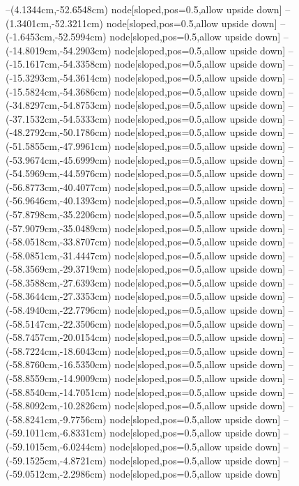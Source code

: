 --(4.1344cm,-52.6548cm) node[sloped,pos=0.5,allow upside down]{\ArrowIn}
--(1.3401cm,-52.3211cm) node[sloped,pos=0.5,allow upside down]{\ArrowIn}
--(-1.6453cm,-52.5994cm) node[sloped,pos=0.5,allow upside down]{\ArrowIn}
--(-14.8019cm,-54.2903cm) node[sloped,pos=0.5,allow upside down]{\ArrowIn}
--(-15.1617cm,-54.3358cm) node[sloped,pos=0.5,allow upside down]{\arrowIn}
--(-15.3293cm,-54.3614cm) node[sloped,pos=0.5,allow upside down]{\arrowIn}
--(-15.5824cm,-54.3686cm) node[sloped,pos=0.5,allow upside down]{\arrowIn}
--(-34.8297cm,-54.8753cm) node[sloped,pos=0.5,allow upside down]{\ArrowIn}
--(-37.1532cm,-54.5333cm) node[sloped,pos=0.5,allow upside down]{\ArrowIn}
--(-48.2792cm,-50.1786cm) node[sloped,pos=0.5,allow upside down]{\ArrowIn}
--(-51.5855cm,-47.9961cm) node[sloped,pos=0.5,allow upside down]{\ArrowIn}
--(-53.9674cm,-45.6999cm) node[sloped,pos=0.5,allow upside down]{\ArrowIn}
--(-54.5969cm,-44.5976cm) node[sloped,pos=0.5,allow upside down]{\ArrowIn}
--(-56.8773cm,-40.4077cm) node[sloped,pos=0.5,allow upside down]{\ArrowIn}
--(-56.9646cm,-40.1393cm) node[sloped,pos=0.5,allow upside down]{\arrowIn}
--(-57.8798cm,-35.2206cm) node[sloped,pos=0.5,allow upside down]{\ArrowIn}
--(-57.9079cm,-35.0489cm) node[sloped,pos=0.5,allow upside down]{\arrowIn}
--(-58.0518cm,-33.8707cm) node[sloped,pos=0.5,allow upside down]{\ArrowIn}
--(-58.0851cm,-31.4447cm) node[sloped,pos=0.5,allow upside down]{\ArrowIn}
--(-58.3569cm,-29.3719cm) node[sloped,pos=0.5,allow upside down]{\ArrowIn}
--(-58.3588cm,-27.6393cm) node[sloped,pos=0.5,allow upside down]{\ArrowIn}
--(-58.3644cm,-27.3353cm) node[sloped,pos=0.5,allow upside down]{\arrowIn}
--(-58.4940cm,-22.7796cm) node[sloped,pos=0.5,allow upside down]{\ArrowIn}
--(-58.5147cm,-22.3506cm) node[sloped,pos=0.5,allow upside down]{\arrowIn}
--(-58.7457cm,-20.0154cm) node[sloped,pos=0.5,allow upside down]{\ArrowIn}
--(-58.7224cm,-18.6043cm) node[sloped,pos=0.5,allow upside down]{\ArrowIn}
--(-58.8760cm,-16.5350cm) node[sloped,pos=0.5,allow upside down]{\ArrowIn}
--(-58.8559cm,-14.9009cm) node[sloped,pos=0.5,allow upside down]{\ArrowIn}
--(-58.8540cm,-14.7051cm) node[sloped,pos=0.5,allow upside down]{\arrowIn}
--(-58.8092cm,-10.2826cm) node[sloped,pos=0.5,allow upside down]{\ArrowIn}
--(-58.8241cm,-9.7756cm) node[sloped,pos=0.5,allow upside down]{\arrowIn}
--(-59.1011cm,-6.8331cm) node[sloped,pos=0.5,allow upside down]{\ArrowIn}
--(-59.1015cm,-6.0244cm) node[sloped,pos=0.5,allow upside down]{\arrowIn}
--(-59.1525cm,-4.8721cm) node[sloped,pos=0.5,allow upside down]{\ArrowIn}
--(-59.0512cm,-2.2986cm) node[sloped,pos=0.5,allow upside down]{\ArrowIn}
